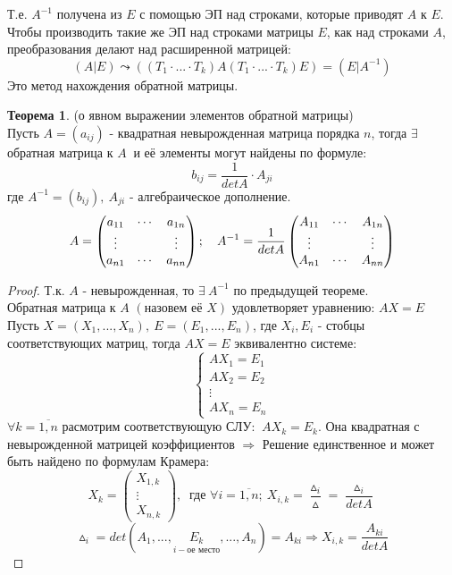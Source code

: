 \documentclass[a4paper, 12pt]{article}
\theoremstyle{definition}
\newtheorem*{theorem}{Теорема}
\begin{document}
  Т.е. $A^{-1}$ получена из $E$ с помощью ЭП над строками, которые приводят $A$ к $E$. \\
  Чтобы производить такие же ЭП над строками матрицы $E$, как над строками $A$, преобразования делают над расширенной матрицей:
  $$(A|E) \leadsto ((T_1 \cdot ... \cdot T_k)A(T_1 \cdot ... \cdot T_k)E) = (E|A^{-1})$$ 
  Это метод нахождения обратной матрицы.
  \begin{theorem}
    (о явном выражении элементов обратной матрицы) \\
    Пусть $A = (a_{ij})$ - квадратная невырожденная матрица порядка $n$, тогда $\exists$ обратная матрица к $A \ $ и её элементы могут найдены по формуле: 
    $$b_{ij} = \frac{1}{detA} \cdot A_{ji}$$
    где $A^{-1} = (b_{ij}), \ A_{ji}$ - алгебраическое дополнение. 
    $$A = \begin{pmatrix}
      a_{11} & \cdots & a_{1n} \\
      \vdots & \null & \vdots \\
      a_{n1} & \cdots & a_{nn} 
    \end{pmatrix}; \ \ \ A^{-1} = \frac{1}{detA} \begin{pmatrix}
      A_{11} & \cdots & A_{1n} \\
      \vdots  & \null & \vdots \\
      A_{n1} &  \cdots & A_{nn} 
    \end{pmatrix}$$    
  \end{theorem} 
  \begin{proof}
    Т.к. $A$ - невырожденная, то $\exists \ A^{-1}$ по предыдущей теореме. \\
    Обратная матрица к $A$ $(\text{назовем её } X)$  удовлетворяет уравнению: $AX=E$ \\
    Пусть $X = (X_1,...,X_n), \ E = (E_1,...,E_n)$, где $X_i, E_i$ - стобцы соответствующих матриц, тогда $AX = E$ эквивалентно системе:
    $$\begin{cases}
      AX_1 = E_1 \\
      AX_2 = E_2 \\
      \vdots \\
      AX_n = E_n
    \end{cases}$$    
    $\forall k = \overline{1,n}$ расмотрим соответствующую СЛУ: $ \ AX_k = E_k $. Она квадратная с невырожденной матрицей коэффициентов $\Longrightarrow $ Решение единственное и может быть найдено по формулам Крамера:
    $$X_k = \begin{pmatrix}
    X_{1,k} \\ \vdots \\ X_{n,k} \end{pmatrix}, \  \text{ где } \forall i = \overline{1,n}; \ X_{i,k} = \frac{\vartriangle_i}{\vartriangle} = \frac{\vartriangle_i}{detA}$$
    $$\vartriangle_i = det(A_1,...,\underset{i- \text{ое место}}{E_k} ,...,A_n) = A_{ki} \Longrightarrow X_{i,k} = \frac{A_{ki}}{detA}$$ 
  \end{proof} 
  
\end{document}
